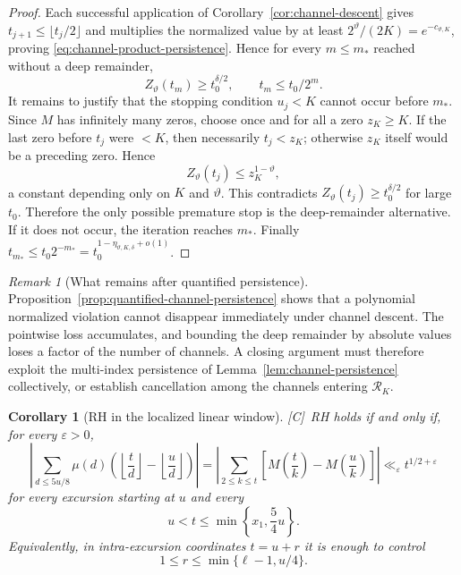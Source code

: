 \documentclass[11pt,reqno]{amsart}
\numberwithin{equation}{section}
\theoremstyle{plain}
\newtheorem{corollary}[theorem]{Corollary}
\theoremstyle{definition}
\theoremstyle{remark}
\newtheorem{remark}[theorem]{Remark}
\newcommand{\eps}{\varepsilon}
\newcommand{\tagC}{\textup{[C]}}
\begin{document}
\begin{proof}
Each successful application of Corollary~\ref{cor:channel-descent} gives
$t_{j+1}\le\lfloor t_j/2\rfloor$ and multiplies the normalized value by at
least $2^\vartheta/(2K)=e^{-c_{\vartheta,K}}$, proving
\eqref{eq:channel-product-persistence}. Hence for every $m\le m_*$ reached
without a deep remainder,
\begin{equation}
 Z_\vartheta(t_m)\ge t_0^{\delta/2},
 \qquad
 t_m\le t_0/2^m.
\end{equation}
It remains to justify that the stopping condition $u_j<K$ cannot occur
before $m_*$. Since $M$ has infinitely many zeros, choose once and for all
a zero $z_K\ge K$. If the last zero before $t_j$ were $<K$, then necessarily
$t_j<z_K$; otherwise $z_K$ itself would be a preceding zero. Hence
\begin{equation}
 Z_\vartheta(t_j)\le z_K^{1-\vartheta},
\end{equation}
a constant depending only on $K$ and $\vartheta$. This contradicts
$Z_\vartheta(t_j)\ge t_0^{\delta/2}$ for large $t_0$. Therefore the only
possible premature stop is the deep-remainder alternative. If it does not
occur, the iteration reaches $m_*$. Finally
$t_{m_*}\le t_0 2^{-m_*}=t_0^{1-\eta_{\vartheta,K,\delta}+o(1)}$.
\end{proof}

\begin{remark}[What remains after quantified persistence]
\label{rem:quantified-persistence-gap}
Proposition~\ref{prop:quantified-channel-persistence} shows that a
polynomial normalized violation cannot disappear immediately under channel
descent. The pointwise loss accumulates,
and bounding the deep remainder by absolute values loses a factor of the
number of channels.  A closing argument must therefore exploit the
multi-index persistence of Lemma~\ref{lem:channel-persistence} collectively,
or establish cancellation among the channels entering $\mathcal R_K$.
\end{remark}

\begin{corollary}[RH in the localized linear window]
\label{cor:linear-window-RH}
\tagC\ RH holds if and only if, for every $\eps>0$,
\begin{equation}
\left|\sum_{d\le5u/8}\mu(d)\left(\left\lfloor\frac td\right\rfloor
-\left\lfloor\frac ud\right\rfloor\right)\right|
=\left|\sum_{2\le k\le t}\left[M\left(\frac tk\right)-M\left(\frac uk\right)\right]\right|
\ll_\eps t^{1/2+\eps}
\end{equation}
for every excursion starting at $u$ and every
\begin{equation}
u<t\le\min\left\{x_1,\frac54u\right\}.
\end{equation}
Equivalently, in intra-excursion coordinates $t=u+r$ it is enough to
control
\begin{equation}
1\le r\le\min\{\ell-1,u/4\}.
\end{equation}
\end{corollary}
\end{document}
